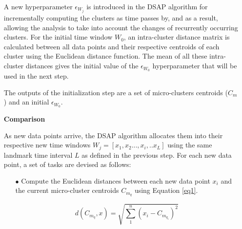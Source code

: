 \documentclass[../UNBThesis2.tex]{subfiles}
\begin{document}
\begin{itemize}[leftmargin=*]
A new hyperparameter $\epsilon_{W_j}$ is introduced in the DSAP algorithm for incrementally computing the clusters as time passes by, and as a result, allowing the analysis to take into account the changes of recurrently occurring clusters. For the initial time window $W_0$, an intra-cluster distance matrix is calculated between all data points and their respective centroids of each cluster using the Euclidean distance function. The mean of all these intra-cluster distances gives the initial value of the $\epsilon_{W_0}$ hyperparameter that will be used in the next step.

The outputs of the initialization step are a set of micro-clusters centroids ($C_m$) and an initial $\epsilon_{W_0}$.


   
    
    
    
    

    
    
\item[]\textbf{Comparison}

As new data points arrive, the DSAP algorithm allocates them into their respective new time windows $W_j = [x_1,x_2...,x_i,..x_L]$ using the same landmark time interval $L$ as defined in the previous step. For each new data point, a set of tasks are devised as follows:

\begin{itemize}
    \item[$\bullet$] Compute the Euclidean distances between each new data point $x_i$ and the current micro-cluster centroids $C_{m_q}$ using Equation \ref{eq1}.
    
    \begin{equation}
    d\left( C_{m_q},x \right)   = \sqrt { \sum_{1}^{n} \left( x_{i} - C_{m_{q_i}}\right)^2} \label{eq1}
    \end{equation}


\end{itemize}
\end{itemize}
\end{document}
